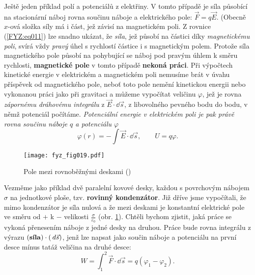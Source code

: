     Ještě jeden příklad polí a potenciálů z elektřiny. V tomto případě je síla působící na 
    stacionární náboj rovna součinu náboje a elektrického pole: \(\vec{F}= q\vec{E}\). (Obecně 
    \(x\)-ová složka síly má i část, jež závisí na magnetickém poli. Z rovnice (\ref{FYZ:eq011}) 
    lze snadno ukázat, že \emph{síla}, jež působí na částici díky \emph{magnetickému poli}, svírá 
    vždy \emph{pravý} úhel s rychlostí částice i s magnetickým polem. Protože síla magnetického 
    pole působí na pohybující se náboj pod pravým úhlem k směru rychlosti, \textbf{magnetické pole} 
    v tomto případě \textbf{nekoná práci}. Při výpočtech kinetické energie v elektrickém a 
    magnetickém poli nemusíme brát v úvahu příspěvek od magnetického pole, neboť toto pole nemění 
    kinetickou energii nebo vykonanou práci jako při gravitaci a můžeme vypočítat veličinu 
    \(\varphi\), jež je rovna \emph{zápornému dráhovému integrálu} z \(\vec{E}\cdot\dd{\vec{s}}\), 
    z libovolného pevného bodu do bodu, v němž potenciál počítáme. \emph{Potenciální energie v 
    elektrickém poli je pak právě rovna součinu náboje \(q\) a potenciálu \(\varphi\)}
    \begin{equation}\label{FYZ:eq012}
      \varphi(r) = -\int\vec{E}\cdot\dd{\vec{s}}, \qquad U = q\varphi.
    \end{equation}
    
    \begin{figure}[ht!]  %
      \centering
      \texttt{[image: fyz\_fig019.pdf]}
      \caption{Pole mezi rovnoběžnými deskami (\cite[s.~207]{Feynman01})}
      \label{fyz:fig019}
    \end{figure}   
    Vezměme jako příklad dvě paralelní kovové desky, každou s povrchovým nábojem \(\sigma\) na 
    jednotkové ploše, tzv. \textbf{rovinný kondenzátor}. Již dříve jsme vypočítali, že mimo 
    kondenzátor je síla nulová a že mezi deskami je konstantní elektrické pole ve směru od \(+\) k 
    \(-\) velikosti \(\frac{\sigma}{\varepsilon_0}\) (obr. \ref{fyz:fig019}). Chtěli bychom 
    zjistit, jaká práce se vykoná přenesením náboje z jedné desky na druhou. Práce bude rovna 
    integrálu z výrazu \((\text{\textbf{síla}})\cdot(\hspace{2pt}d\vec{s})\), jenž lze napsat jako součin 
    náboje a potenciálu na první desce mínus tatáž veličina na druhé desce:
    \begin{equation}\label{FYZ:eq013}
      W = \int_1^2\vec{F}\cdot\dd{\vec{s}} = q(\varphi_1 -\varphi_2).
    \end{equation}

